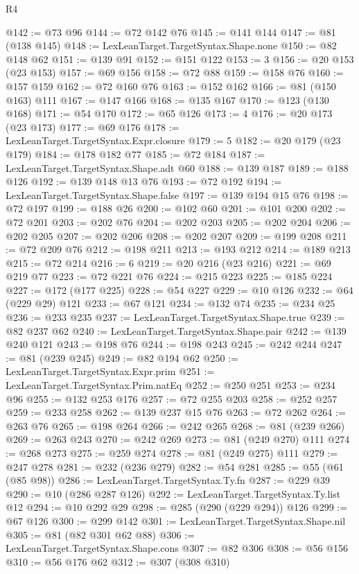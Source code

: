 \begin{lexlean}{R4}
\begin{coremodule}
{{{{{{{{{{{{{{{{{{{{{{{{{{{{{@142 := @73 @96
@144 := @72 @142 @76
@145 := @141 @144
@147 := @81 (@138 @145)
@148 := LexLeanTarget.TargetSyntax.Shape.none
@150 := @82 @148 @62
@151 := @139 @91
@152 := @151 @122
@153 := 3
@156 := @20 @153 (@23 @153)
@157 := @69 @156
@158 := @72 @88
@159 := @158 @76
@160 := @157 @159
@162 := @72 @160 @76
@163 := @152 @162
@166 := @81 (@150 @163) @111
@167 := @147 @166
@168 := @135 @167
@170 := @123 (@130 @168)
@171 := @54 @170
@172 := @65 @126
@173 := 4
@176 := @20 @173 (@23 @173)
@177 := @69 @176
@178 := LexLeanTarget.TargetSyntax.Expr.closure
@179 := 5
@182 := @20 @179 (@23 @179)
@184 := @178 @182 @77
@185 := @72 @184
@187 := LexLeanTarget.TargetSyntax.Shape.adt @60
@188 := @139 @187
@189 := @188 @126
@192 := @139 @148 @13 @76
@193 := @72 @192
@194 := LexLeanTarget.TargetSyntax.Shape.false
@197 := @139 @194 @15 @76
@198 := @72 @197
@199 := @188 @26
@200 := @102 @60
@201 := @101 @200
@202 := @72 @201
@203 := @202 @76
@204 := @202 @203
@205 := @202 @204
@206 := @202 @205
@207 := @202 @206
@208 := @202 @207
@209 := @199 @208
@211 := @72 @209 @76
@212 := @198 @211
@213 := @193 @212
@214 := @189 @213
@215 := @72 @214
@216 := 6
@219 := @20 @216 (@23 @216)
@221 := @69 @219 @77
@223 := @72 @221 @76
@224 := @215 @223
@225 := @185 @224
@227 := @172 (@177 @225)
@228 := @54 @227
@229 := @10 @126
@232 := @64 (@229 @29) @121
@233 := @67 @121
@234 := @132 @74
@235 := @234 @25
@236 := @233 @235
@237 := LexLeanTarget.TargetSyntax.Shape.true
@239 := @82 @237 @62
@240 := LexLeanTarget.TargetSyntax.Shape.pair
@242 := @139 @240 @121
@243 := @198 @76
@244 := @198 @243
@245 := @242 @244
@247 := @81 (@239 @245)
@249 := @82 @194 @62
@250 := LexLeanTarget.TargetSyntax.Expr.prim
@251 := LexLeanTarget.TargetSyntax.Prim.natEq
@252 := @250 @251
@253 := @234 @96
@255 := @132 @253 @176
@257 := @72 @255 @203
@258 := @252 @257
@259 := @233 @258
@262 := @139 @237 @15 @76
@263 := @72 @262
@264 := @263 @76
@265 := @198 @264
@266 := @242 @265
@268 := @81 (@239 @266)
@269 := @263 @243
@270 := @242 @269
@273 := @81 (@249 @270) @111
@274 := @268 @273
@275 := @259 @274
@278 := @81 (@249 @275) @111
@279 := @247 @278
@281 := @232 (@236 @279)
@282 := @54 @281
@285 := @55 (@61 (@85 @98))
@286 := LexLeanTarget.TargetSyntax.Ty.fn
@287 := @229 @39
@290 := @10 (@286 @287 @126)
@292 := LexLeanTarget.TargetSyntax.Ty.list @12
@294 := @10 @292 @29
@298 := @285 (@290 (@229 @294)) @126
@299 := @67 @126
@300 := @299 @142
@301 := LexLeanTarget.TargetSyntax.Shape.nil
@305 := @81 (@82 @301 @62 @88)
@306 := LexLeanTarget.TargetSyntax.Shape.cons
@307 := @82 @306
@308 := @56 @156
@310 := @56 @176 @62
@312 := @307 (@308 @310)
}}}}}}}}}}}}}}}}}}}}}}}}}}}}}
\end{coremodule}
\end{lexlean}
